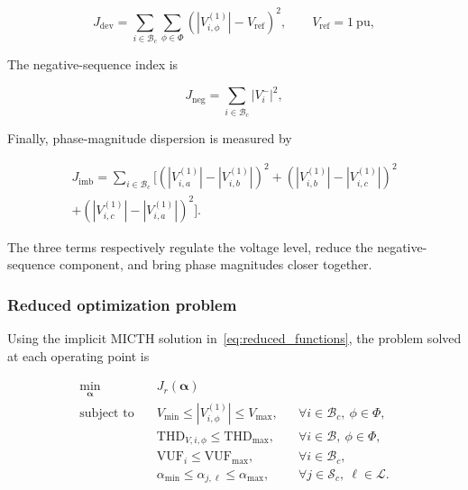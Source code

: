 \documentclass[journal]{IEEEtran}
\begin{document}
\begin{equation}
    J_{\mathrm{dev}} =
    \sum_{i\in\mathcal{B}_c}\sum_{\phi\in\Phi}
    \left(\left|V_{i,\phi}^{(1)}\right| - V_{\mathrm{ref}}\right)^2,
    \qquad V_{\mathrm{ref}}=1~\mathrm{pu},
    \label{eq:obj_dev}
\end{equation}

The negative-sequence index is

\begin{equation}
    J_{\mathrm{neg}} =
    \sum_{i\in\mathcal{B}_c}\left|V_i^{-}\right|^2,
    \label{eq:obj_neg}
\end{equation}

Finally, phase-magnitude dispersion is measured by

\begin{equation}
\begin{aligned}
    J_{\mathrm{imb}} =
    \sum_{i\in\mathcal{B}_c}
    \bigl[
    \left(\left|V_{i,a}^{(1)}\right|-\left|V_{i,b}^{(1)}\right|\right)^2
    +\left(\left|V_{i,b}^{(1)}\right|-\left|V_{i,c}^{(1)}\right|\right)^2 \\
    +\left(\left|V_{i,c}^{(1)}\right|-\left|V_{i,a}^{(1)}\right|\right)^2
    \bigr].
\end{aligned}
    \label{eq:obj_imb}
\end{equation}

The three terms respectively regulate the voltage level, reduce the
negative-sequence component, and bring phase magnitudes closer together.

\subsubsection{Reduced optimization problem}

Using the implicit MICTH solution in~\eqref{eq:reduced_functions}, the problem
solved at each operating point is

\begin{subequations}
\label{eq:optproblem}
\begin{align}
    \min_{\boldsymbol{\alpha}} \quad
        & J_r(\boldsymbol{\alpha}) \label{eq:obj} \\[4pt]
    \text{subject to} \quad
        & V_{\min} \leq \left|V_{i,\phi}^{(1)}\right| \leq V_{\max},
          && \forall i\in\mathcal{B}_c,\ \phi\in\Phi,
          \label{eq:vconstrain} \\
        & \mathrm{THD}_{V,i,\phi} \leq \mathrm{THD}_{\max},
          && \forall i\in\mathcal{B},\ \phi\in\Phi,
          \label{eq:thdconstrain} \\
        & \mathrm{VUF}_i \leq \mathrm{VUF}_{\max},
          && \forall i\in\mathcal{B}_c,
          \label{eq:vufconstrain} \\
        & \alpha_{\min} \leq \alpha_{j,\ell} \leq \alpha_{\max},
          && \forall j\in\mathcal{S}_c,\ \ell\in\mathcal{L}.
          \label{eq:alphabounds}
\end{align}
\end{subequations}
\end{document}
